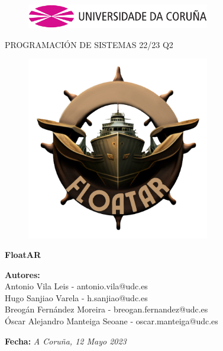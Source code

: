 \documentclass[a4paper, openright, 12pt]{article}
\begin{document}
\begin{titlepage}

\begin{center}
\vspace*{-1in}
\begin{figure}[htb]
\begin{center}
\includegraphics[width=8cm]{udc.eps}
\end{center}
\end{figure}

\vspace*{1in}
PROGRAMACIÓN DE SISTEMAS 22/23 Q2\\
\begin{figure}[htb]
\begin{center}
\includegraphics[width=8cm]{icono.png}
\end{center}
\end{figure}
\begin{Large}
\textbf{FloatAR} \\
\end{Large}

\vspace*{1in}

\begin{large}
\raggedleft
\textbf{Autores:}\\
{Antonio Vila Leis - antonio.vila@udc.es\\Hugo Sanjiao Varela - h.sanjiao@udc.es\\Breogán Fernández Moreira - breogan.fernandez@udc.es\\Óscar Alejandro Manteiga Seoane - oscar.manteiga@udc.es\\}

\vspace{1in}

\textbf{Fecha:}\textit{ A Coruña, 12 Mayo 2023}\\
\end{large}

\end{center}
\end{titlepage} 
\end{document}
